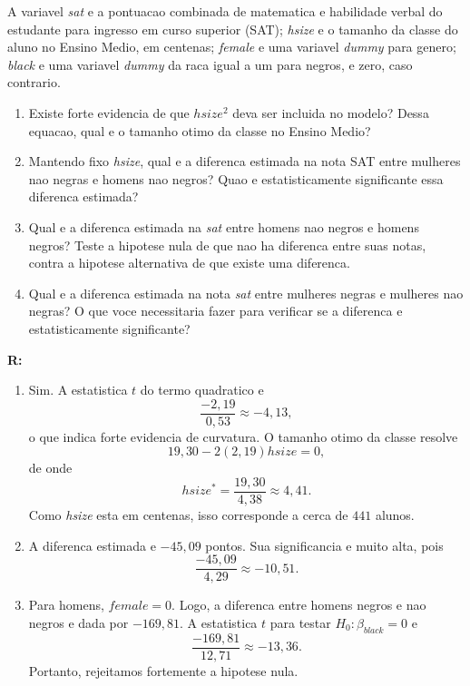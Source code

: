 \documentclass[12pt,letterpaper, onecolumn]{exam}
\renewenvironment{solution}
{\par\noindent\textbf{R:}\enspace\color{blue}}
{\par\color{black}}
\begin{document}
\begin{questions}
A variavel \textit{sat} e a pontuacao combinada de matematica e habilidade verbal do estudante para ingresso em curso superior (SAT); \textit{hsize} e o tamanho da classe do aluno no Ensino Medio, em centenas; \textit{female} e uma variavel \textit{dummy} para genero; \textit{black} e uma variavel \textit{dummy} da raca igual a um para negros, e zero, caso contrario.
\begin{enumerate}[label=(\roman*)]
    \item Existe forte evidencia de que \(hsize^2\) deva ser incluida no modelo? Dessa equacao, qual e o tamanho otimo da classe no Ensino Medio?
    \item Mantendo fixo \textit{hsize}, qual e a diferenca estimada na nota SAT entre mulheres nao negras e homens nao negros? Quao e estatisticamente significante essa diferenca estimada?
    \item Qual e a diferenca estimada na \textit{sat} entre homens nao negros e homens negros? Teste a hipotese nula de que nao ha diferenca entre suas notas, contra a hipotese alternativa de que existe uma diferenca.
    \item Qual e a diferenca estimada na nota \textit{sat} entre mulheres negras e mulheres nao negras? O que voce necessitaria fazer para verificar se a diferenca e estatisticamente significante?
\end{enumerate}

\begin{solution}
\begin{enumerate}[label=(\roman*)]
    \item Sim. A estatistica \(t\) do termo quadratico e
    \[
    \frac{-2,19}{0,53}\approx -4,13,
    \]
    o que indica forte evidencia de curvatura. O tamanho otimo da classe resolve
    \[
    19,30 - 2(2,19)hsize = 0,
    \]
    de onde
    \[
    hsize^\ast = \frac{19,30}{4,38}\approx 4,41.
    \]
    Como \textit{hsize} esta em centenas, isso corresponde a cerca de \(441\) alunos.

    \item A diferenca estimada e \(-45,09\) pontos. Sua significancia e muito alta, pois
    \[
    \frac{-45,09}{4,29}\approx -10,51.
    \]

    \item Para homens, \(female=0\). Logo, a diferenca entre homens negros e nao negros e dada por \(-169,81\). A estatistica \(t\) para testar \(H_0:\beta_{black}=0\) e
    \[
    \frac{-169,81}{12,71}\approx -13,36.
    \]
    Portanto, rejeitamos fortemente a hipotese nula.


\end{enumerate}
\end{solution}
\end{questions}
\end{document}
